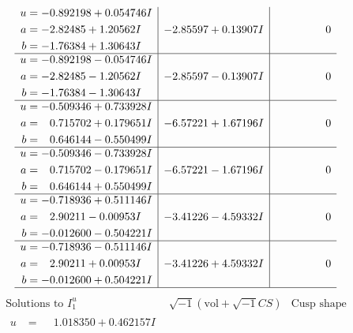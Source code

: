 \documentclass[1p]{elsarticle_modified}
\theoremstyle{definition}
\newcommand{\I}{\sqrt{-1}}
\begin{document}
$$\begin{array}{c|c|c}
\begin{aligned}
u &= -0.892198 + 0.054746 I \\
a &= -2.82485 + 1.20562 I \\
b &= -1.76384 + 1.30643 I\end{aligned}
 & -2.85597 + 0.13907 I & \phantom{-0.000000 } 0 \\ \hline\begin{aligned}
u &= -0.892198 - 0.054746 I \\
a &= -2.82485 - 1.20562 I \\
b &= -1.76384 - 1.30643 I\end{aligned}
 & -2.85597 - 0.13907 I & \phantom{-0.000000 } 0 \\ \hline\begin{aligned}
u &= -0.509346 + 0.733928 I \\
a &= \phantom{-}0.715702 + 0.179651 I \\
b &= \phantom{-}0.646144 - 0.550499 I\end{aligned}
 & -6.57221 + 1.67196 I & \phantom{-0.000000 } 0 \\ \hline\begin{aligned}
u &= -0.509346 - 0.733928 I \\
a &= \phantom{-}0.715702 - 0.179651 I \\
b &= \phantom{-}0.646144 + 0.550499 I\end{aligned}
 & -6.57221 - 1.67196 I & \phantom{-0.000000 } 0 \\ \hline\begin{aligned}
u &= -0.718936 + 0.511146 I \\
a &= \phantom{-}2.90211 - 0.00953 I \\
b &= -0.012600 - 0.504221 I\end{aligned}
 & -3.41226 - 4.59332 I & \phantom{-0.000000 } 0 \\ \hline\begin{aligned}
u &= -0.718936 - 0.511146 I \\
a &= \phantom{-}2.90211 + 0.00953 I \\
b &= -0.012600 + 0.504221 I\end{aligned}
 & -3.41226 + 4.59332 I & \phantom{-0.000000 } 0\\
 \hline 
 \end{array}$$\newpage$$\begin{array}{c|c|c}  
\text{Solutions to }I^u_{1}& \I (\text{vol} + \sqrt{-1}CS) & \text{Cusp shape}\\
 \hline 
\begin{aligned}
u &= \phantom{-}1.018350 + 0.462157 I \\

\end{aligned}
\end{array}$$
\end{document}
